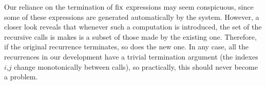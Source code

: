\medskip
Our reliance on the termination of $\operatorname{fix}$ expressions may seem conspicuous, since some of these
expressions are generated automatically by the system. However, a closer look reveals that whenever
such a computation is introduced, the set of the recursive calls is makes is a subset of those made by the existing one.
Therefore, if the original recurrence terminates, so does the new one. In any case, all the recurrences
in our development have a trivial termination argument (the indexes $i$,$j$ change monotonically between calls),
so practically, this should never become a problem.
